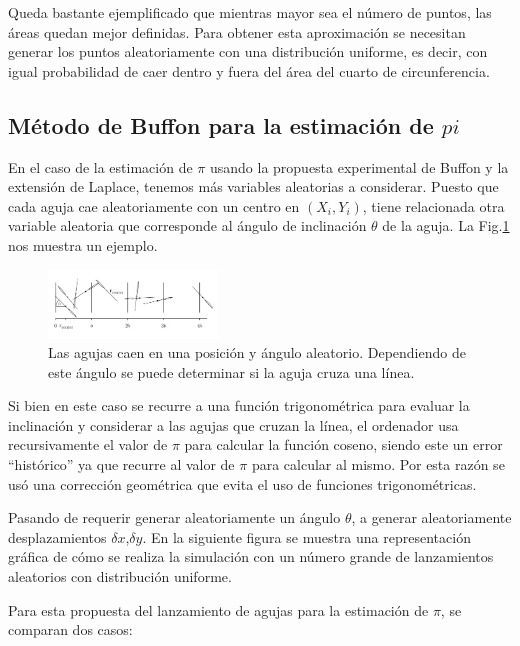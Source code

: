 \documentclass{rbf}
\begin{document}
Queda bastante ejemplificado que mientras mayor sea el número de puntos, las áreas quedan mejor definidas.
Para obtener esta aproximación se necesitan generar los puntos aleatoriamente con una distribución uniforme, es decir, con igual probabilidad de caer dentro y fuera del área del cuarto de circunferencia.

\subsection{Método de Buffon para la estimación de $pi$}

En el caso de la estimación de $\pi$ usando la propuesta experimental de Buffon y la extensión de Laplace, tenemos más variables aleatorias a considerar. Puesto que cada aguja cae aleatoriamente con un centro en $(X_i,Y_i)$, tiene relacionada otra variable aleatoria que corresponde al ángulo de inclinación $\theta$ de la aguja. La Fig.\ref{aguja} nos muestra un ejemplo.



\begin{figure}[tbp!]
 \centering
  \includegraphics[width=0.4\textwidth]{figures/agujas.jpg}
	\caption{Las agujas caen en una posición y ángulo aleatorio. Dependiendo de este ángulo se puede determinar si la aguja cruza una línea.\cite{krauth}}
 \label{aguja}
\end{figure}

Si bien en este caso se recurre a una función trigonométrica para evaluar la inclinación y considerar a las agujas que cruzan la línea, el ordenador usa recursivamente el valor de $\pi$ para calcular la función coseno, siendo este un error “histórico” ya que recurre al valor de $\pi$ para calcular al mismo. Por esta razón se usó una corrección geométrica que evita el uso de funciones trigonométricas.

Pasando de requerir generar aleatoriamente un ángulo $\theta$, a generar aleatoriamente desplazamientos $\delta x$,$\delta y$. En la siguiente figura se muestra una representación gráfica de cómo se realiza la simulación con un número grande de lanzamientos aleatorios con distribución uniforme. \cite{krauth}

Para esta propuesta del lanzamiento de agujas para la estimación de $\pi$, se comparan dos casos:
\end{document}
